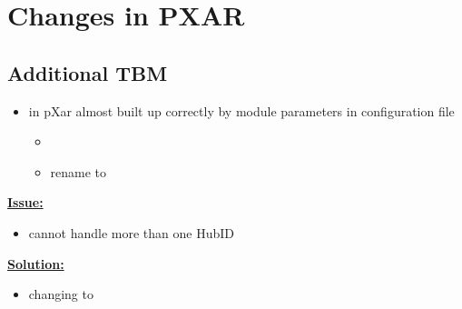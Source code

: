 \documentclass[9pt]{beamer}
\begin{document}
\section{Changes in PXAR}
\subsection{Additional TBM}
\begin{frame}
	\begin{itemize}
		\item {} in pXar almost built up correctly by module parameters in configuration file
		\begin{itemize}
			\item {}
			\item rename  to 
		\end{itemize}
	\end{itemize}
	\vspace*{10pt}
	\underline{\textbf{Issue:}}
	\begin{itemize}
		\item cannot handle more than one HubID 
	\end{itemize}
	\vspace*{10pt}
	\underline{\textbf{Solution:}}
	\begin{itemize}
		\item changing  to 
	\end{itemize}

\end{frame}
\end{document}
